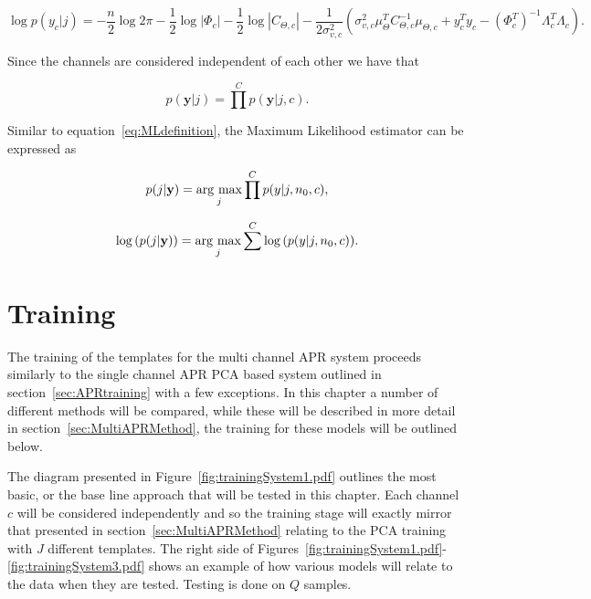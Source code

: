 \begin{equation}\label{eq:loglikeli_c}
\log{p(y_c|j)} = - \frac{n}{2}\log{2 \pi}- \frac{1}{2}\log{|\Phi_c|} - \frac{1}{2}\log{|C_{\Theta,c}|} - \frac{1}{2\sigma^2_{v,c}}\left(\sigma_{v,c}^2\mu_\Theta^TC_{\Theta,c}^{-1}\mu_{\Theta,c} + y_c^Ty_c- \left(\Phi_c^T\right)^{-1}\Lambda_c^T\Lambda_c\right).
\end{equation}

Since the channels are considered independent of each other we have that

\begin{equation}\label{eq:jointprob_c}
p(\textbf{y} | j) = \prod^C p(\textbf{y} | j, c).
\end{equation}

Similar to equation~\ref{eq:MLdefinition}, the Maximum Likelihood estimator can be expressed as

\begin{equation}\label{eq:MLdefinition_c}
p(j |\textbf{y}) = \underset{j}{\mathrm{arg~max}} \prod^C p(y|j,n_0,c),
\end{equation}

\begin{equation}\label{eq:MLdefinition2_c}
\log{\left( p(j |\textbf{y})\right)} = \underset{j}{\mathrm{arg~max}} \sum^C \log{\left( p(y|j,n_0,c) \right)}.
\end{equation}

\section{Training}\label{sec:MultiAPRTraining}
The training of the templates for the multi channel APR system proceeds similarly to the single channel APR PCA based system outlined in section~\ref{sec:APRtraining} with a few exceptions. In this chapter a number of different methods will be compared, while these will be described in more detail in section~\ref{sec:MultiAPRMethod}, the training for these models will be outlined below.

The diagram presented in Figure~\ref{fig:trainingSystem1.pdf} outlines the most basic, or the base line approach that will be tested in this chapter. Each channel $c$ will be considered independently and so the training stage will exactly mirror that presented in section~\ref{sec:MultiAPRMethod} relating to the PCA training with $J$ different templates. The right side of Figures~\ref{fig:trainingSystem1.pdf}-\ref{fig:trainingSystem3.pdf} shows an example of how various models will relate to the data when they are tested. Testing is done on $Q$ samples. 

